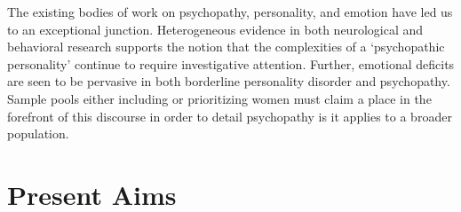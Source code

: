 \documentclass[
  man,floatsintext]{apa7}
\begin{document}
The existing bodies of work on psychopathy, personality, and emotion have led us to an exceptional junction. Heterogeneous evidence in both neurological and behavioral research supports the notion that the complexities of a `psychopathic personality' continue to require investigative attention. Further, emotional deficits are seen to be pervasive in both borderline personality disorder and psychopathy. Sample pools either including or prioritizing women must claim a place in the forefront of this discourse in order to detail psychopathy is it applies to a broader population.

\hypertarget{present-aims}{%
\section{Present Aims}\label{present-aims}}
\end{document}
